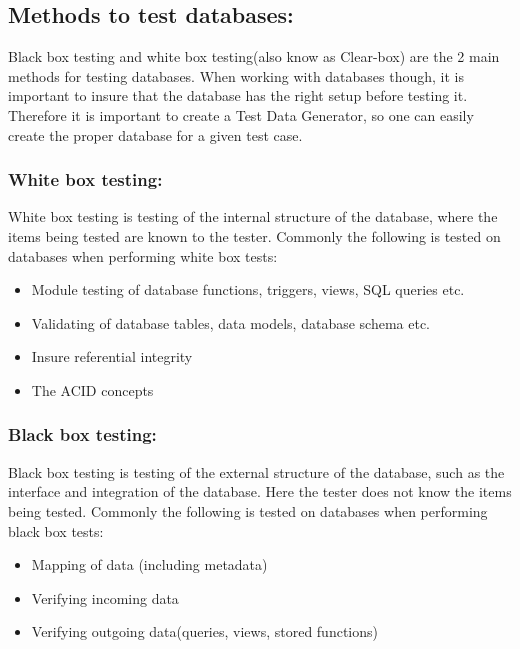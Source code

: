 \subsection{Methods to test databases:}

Black box testing and white box testing(also know as Clear-box) are the 2 main methods for testing databases.
When working with databases though, it is important to insure that the database has the right setup before testing it. Therefore it is important to create a Test Data Generator, so one can easily create the proper database for a given test case.


\subsubsection{White box testing:} 
White box testing is testing of the internal structure of the database, where the items being tested are known to the tester.  Commonly the following is tested on databases when performing white box tests:
\begin{itemize}
	\item Module testing of database functions, triggers, views, SQL queries etc.
	\item Validating of database tables, data models, database schema etc.
	\item Insure referential integrity
	\item The ACID concepts
\end{itemize}

\subsubsection{Black box testing:}
Black box testing is testing of the external structure of the database, such as the interface and integration of the database. Here the tester does not know the items being tested. Commonly the following is tested on databases when performing black box tests:

\begin{itemize}
	\item Mapping of data (including metadata)
	\item Verifying incoming data
	\item Verifying outgoing  data(queries, views, stored functions)
\end{itemize}